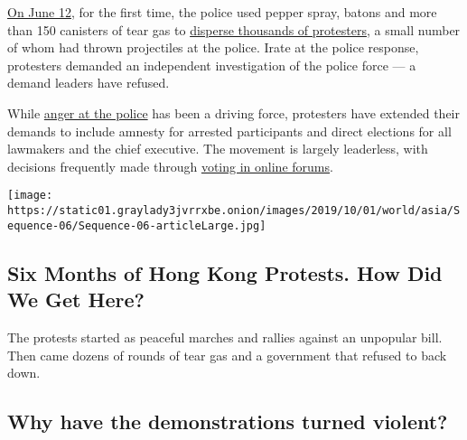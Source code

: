 \href{https://www.nytimes3xbfgragh.onion/video/world/asia/100000006602584/hong-kong-police-protest-video-investigation.html?rref=collection\%2Fbyline\%2Fbarbara-marcolini\&action=click\&contentCollection=undefined\&region=stream\&module=stream_unit\&version=latest\&contentPlacement=9\&pgtype=collection}{On
June 12}, for the first time, the police used pepper spray, batons and
more than 150 canisters of tear gas to
\href{https://www.nytimes3xbfgragh.onion/2019/06/12/world/asia/hong-kong-extradition-protest.html?searchResultPosition=8\&module=inline}{disperse
thousands of protesters}, a small number of whom had thrown projectiles
at the police. Irate at the police response, protesters demanded an
independent investigation of the police force --- a demand leaders have
refused.

While
\href{https://www.nytimes3xbfgragh.onion/video/world/asia/100000006702862/hong-kong-protests-police-officers.html?rref=collection\%2Fbyline\%2Fbarbara-marcolini}{anger
at the police} has been a driving force, protesters have extended their
demands to include amnesty for arrested participants and direct
elections for all lawmakers and the chief executive. The movement is
largely leaderless, with decisions frequently made through
\href{https://www.nytimes3xbfgragh.onion/interactive/2019/06/28/world/asia/hong-kong-protests.html}{voting
in online forums}.

\href{https://www.nytimes3xbfgragh.onion/interactive/2019/world/asia/hong-kong-protests-arc.html}{}

\texttt{[image: https://static01.graylady3jvrrxbe.onion/images/2019/10/01/world/asia/Sequence-06/Sequence-06-articleLarge.jpg]}

\hypertarget{six-months-of-hong-kong-protests-how-did-we-get-here}{%
\subsection{Six Months of Hong Kong Protests. How Did We Get
Here?}\label{six-months-of-hong-kong-protests-how-did-we-get-here}}

The protests started as peaceful marches and rallies against an
unpopular bill. Then came dozens of rounds of tear gas and a government
that refused to back down.

\hypertarget{why-have-the-demonstrations-turned-violent}{%
\subsection{Why have the demonstrations turned
violent?}\label{why-have-the-demonstrations-turned-violent}}

